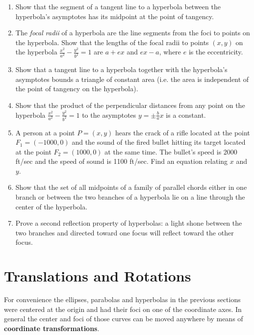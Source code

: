 {\begin{enumerate}[\bfseries 1.]
  directrices has the same length as the line segment between the vertexes.
 \item Show that the segment of a tangent line to a hyperbola between the
  hyperbola's asymptotes has its midpoint at the point of tangency.
 \item The \emph{focal radii}
  of a hyperbola are the line segments from the foci to points on the hyperbola.
  Show that the lengths of the focal radii to points $(x,y)$ on the hyperbola
  $\frac{x^2}{a^2} - \frac{y^2}{b^2}=1$ are $a+ex$ and $ex-a$, where $e$ is the
  eccentricity.
 \item Show that a tangent line to a hyperbola together with the hyperbola's
  asymptotes bounds a triangle of constant area (i.e. the area is independent of
  the point of tangency on the hyperbola).
 \item Show that the product of the perpendicular distances from any point on
  the hyperbola $\frac{x^2}{a^2} - \frac{y^2}{b^2}=1$ to the asymptotes
  $y = \pm\frac{b}{a}x$ is a constant.
 \item A person at a point $P=(x,y)$ hears the crack of a rifle located at the
  point $F_1=(-1000,0)$ and the sound of the fired bullet hitting its target
  located at the point $F_2=(1000,0)$ at the same time. The bullet's speed is
  2000 ft/sec and the speed of sound is 1100 ft/sec. Find an equation relating
  $x$ and $y$.
 \item Show that the set of all midpoints of a family of parallel chords either
  in one branch or between the two branches of a hyperbola lie on a line through
  the center of the hyperbola.
 \item Prove a second reflection property of hyperbolas: a light shone between
  the two branches and directed toward one focus will reflect toward the other
  focus.
\end{enumerate}
}
\newpage
\section{Translations and Rotations}\label{sec:translations-and-rotations}
For convenience the ellipses, parabolas and hyperbolas in the previous sections
were centered at the origin and had their foci on one of the coordinate axes.
In general the center and foci of those curves can be moved anywhere by means of
\textbf{coordinate transformations}.

